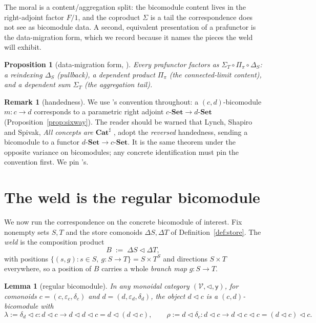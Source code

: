 \documentclass[11pt]{amsart}
\theoremstyle{plain}
\newtheorem{proposition}[theorem]{Proposition}
\newtheorem{lemma}[theorem]{Lemma}
\theoremstyle{definition}
\newtheorem{remark}[theorem]{Remark}
\newcommand{\Cathash}{\mathbf{Cat}^{\sharp}}
\newcommand{\Set}{\mathbf{Set}}
\renewcommand{\lhd}{\triangleleft}
\newcommand{\Store}[1]{\Delta #1}
\newcommand{\yon}{\mathsf{y}}
\begin{document}
The moral is a content/aggregation split: the bicomodule content lives in the right-adjoint
factor $F/1$, and the coproduct $\Sigma$ is a tail the correspondence does not see as
bicomodule data. A second, equivalent presentation of a prafunctor is the data-migration
form, which we record because it names the pieces the weld will exhibit.

\begin{proposition}[data-migration form, {\cite[Prop.~3.20]{SGF}}]\label{prop:datamig}
Every prafunctor factors as $\Sigma_T\circ\Pi_\pi\circ\Delta_S$: a reindexing
$\Delta_S$ (pullback), a dependent product $\Pi_\pi$ (the connected-limit content), and a
dependent sum $\Sigma_T$ (the aggregation tail).
\end{proposition}

\begin{remark}[handedness]\label{rem:handedness}
We use \cite{SGF}'s convention throughout: a $(c,d)$-bicomodule $m\colon c\to d$
corresponds to a parametric right adjoint $c\text{-}\Set\to d\text{-}\Set$
(Proposition~\ref{prop:sixway}). The reader should be warned that Lynch, Shapiro and Spivak,
\emph{All concepts are $\Cathash$} \cite{LSS}, adopt the \emph{reversed} handedness, sending a
bicomodule to a functor $d\text{-}\Set\to c\text{-}\Set$. It is the same theorem under the
opposite variance on bicomodules; any concrete identification must pin the convention first.
We pin \cite{SGF}'s.
\end{remark}

\section{The weld is the regular bicomodule}\label{sec:weld}

We now run the correspondence on the concrete bicomodule of interest. Fix nonempty sets
$S,T$ and the store comonoids $\Store{S},\Store{T}$ of Definition~\ref{def:store}. The
\emph{weld} is the composition product
\[
B\;:=\;\Store{S}\lhd\Store{T},
\]
with positions $\{(s,g):s\in S,\ g\colon S\to T\}=S\times T^{S}$ and directions $S\times T$
everywhere, so a position of $B$ carries a whole \emph{branch map} $g\colon S\to T$.

\begin{lemma}[regular bicomodule]\label{lem:regular}
In any monoidal category $(\mathcal V,\lhd,\yon)$, for comonoids
$c=(c,\varepsilon_c,\delta_c)$ and $d=(d,\varepsilon_d,\delta_d)$, the object $d\lhd c$ is a
$(c,d)$-bicomodule with
\[
\lambda:=\delta_d\lhd c\colon d\lhd c\to d\lhd d\lhd c=d\lhd(d\lhd c),
\qquad
\rho:=d\lhd\delta_c\colon d\lhd c\to d\lhd c\lhd c=(d\lhd c)\lhd c.
\]
\end{lemma}
\end{document}
